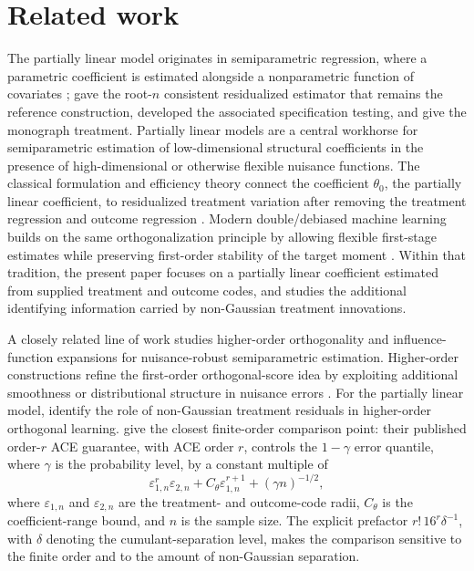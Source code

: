 \section{Related work}

The partially linear model originates in semiparametric regression, where a parametric coefficient is estimated alongside a nonparametric function of covariates \citep{Engle1986,Speckman1988}; \citet{Robinson1988} gave the root-\(n\) consistent residualized estimator that remains the reference construction, \citet{HardleMammen1993} developed the associated specification testing, and \citet{HardleLiangGao2000} give the monograph treatment. Partially linear models are a central workhorse for semiparametric estimation of low-dimensional structural coefficients in the presence of high-dimensional or otherwise flexible nuisance functions. The classical formulation and efficiency theory connect the coefficient \(\theta_0\), the partially linear coefficient, to residualized treatment variation after removing the treatment regression and outcome regression \citep{Hansen1982,Newey1990,Newey1994,NeweyMcFadden1994,BickelKlaassenRitovWellner1993,VanDerVaart1998,VanDerVaartWellner1996}. Modern double/debiased machine learning builds on the same orthogonalization principle by allowing flexible first-stage estimates while preserving first-order stability of the target moment \citep{BelloniChernozhukovHansen2014,ChernozhukovEtAl2018DML}. Within that tradition, the present paper focuses on a partially linear coefficient estimated from supplied treatment and outcome codes, and studies the additional identifying information carried by non-Gaussian treatment innovations.

A closely related line of work studies higher-order orthogonality and influence-function expansions for nuisance-robust semiparametric estimation. Higher-order constructions refine the first-order orthogonal-score idea by exploiting additional smoothness or distributional structure in nuisance errors \citep{RobinsRotnitzkyZhao1994,VanDerLaanRubin2006,RobinsLiTchetgenVanDerVaart2008,LiuMukherjeeNeweyRobins2017,NeweyRobins2018,LiuMukherjeeRobinsTchetgen2021,ChernozhukovEscancianoIchimuraNeweyRobins2022}. For the partially linear model, \citet{MackeySyrgkanisZadik2018} identify the role of non-Gaussian treatment residuals in higher-order orthogonal learning. \citet{JinMackeySyrgkanis2025} give the closest finite-order comparison point: their published order-\(r\) ACE guarantee, with ACE order \(r\), controls the \(1-\gamma\) error quantile, where \(\gamma\) is the probability level, by a constant multiple of
\[
\varepsilon_{1,n}^r\varepsilon_{2,n}
+
C_{\theta}\varepsilon_{1,n}^{r+1}
+
(\gamma n)^{-1/2},
\]
where \(\varepsilon_{1,n}\) and \(\varepsilon_{2,n}\) are the treatment- and outcome-code radii, \(C_{\theta}\) is the coefficient-range bound, and \(n\) is the sample size. The explicit prefactor \(r!\,16^r\delta^{-1}\), with \(\delta\) denoting the cumulant-separation level, makes the comparison sensitive to the finite order and to the amount of non-Gaussian separation.

